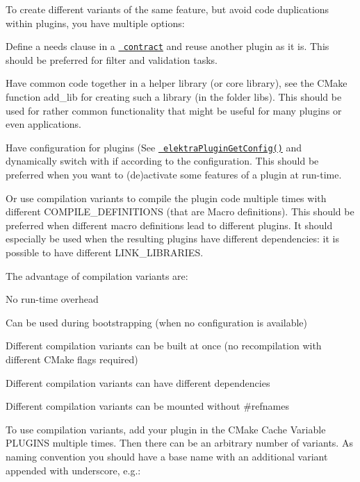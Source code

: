 To create different variants of the same feature, but avoid code duplications within plugins, you have multiple options\+:


\begin{DoxyItemize}
\item Define a needs clause in a \href{/home/mpranj/workspace/libelektra/doc/CONTRACT.ini}{\texttt{ contract}} and reuse another plugin as it is. This should be preferred for filter and validation tasks.
\item Have common code together in a helper library (or core library), see the C\+Make function {\ttfamily add\+\_\+lib} for creating such a library (in the folder libs). This should be used for rather common functionality that might be useful for many plugins or even applications.
\item Have configuration for plugins (See \href{https://doc.libelektra.org/api/latest/html/group__plugin.html}{\texttt{ elektra\+Plugin\+Get\+Config()}} and dynamically switch with {\ttfamily if} according to the configuration. This should be preferred when you want to (de)activate some features of a plugin at run-\/time.
\item Or use compilation variants to compile the plugin code multiple times with different {\ttfamily C\+O\+M\+P\+I\+L\+E\+\_\+\+D\+E\+F\+I\+N\+I\+T\+I\+O\+NS} (that are Macro definitions). This should be preferred when different macro definitions lead to different plugins. It should especially be used when the resulting plugins have different dependencies\+: it is possible to have different {\ttfamily L\+I\+N\+K\+\_\+\+L\+I\+B\+R\+A\+R\+I\+ES}.
\end{DoxyItemize}

The advantage of compilation variants are\+:


\begin{DoxyItemize}
\item No run-\/time overhead
\item Can be used during bootstrapping (when no configuration is available)
\item Different compilation variants can be built at once (no recompilation with different C\+Make flags required)
\item Different compilation variants can have different dependencies
\item Different compilation variants can be mounted without {\ttfamily \#refnames}
\end{DoxyItemize}

To use compilation variants, add your plugin in the C\+Make Cache Variable {\ttfamily P\+L\+U\+G\+I\+NS} multiple times. Then there can be an arbitrary number of variants. As naming convention you should have a base name with an additional variant appended with underscore, e.\+g.\+:



